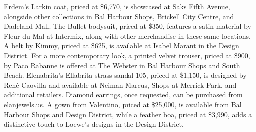 \begin{tcolorbox}[title = {Case 3}, colframe=darkgreen, colback=lightgray, breakable]
Erdem's Larkin coat, priced at \$6,770, is showcased at Saks Fifth Avenue, alongside other collections in Bal Harbour Shops, Brickell City Centre, and Dadeland Mall. The Bullet bodysuit, priced at \$350, features a satin material by Fleur du Mal at Intermix, along with other merchandise in these same locations. A belt by Kimmy, priced at \$625, is available at Isabel Marant in the Design District. For a more contemporary look, a printed velvet trouser, priced at \$900, by Paco Rabanne is offered at The Webster in Bal Harbour Shops and South Beach.
Elenabrita's Ellabrita strass sandal 105, priced at \$1,150, is designed by René Caovilla and available at Neiman Marcus, Shops at Merrick Park, and additional retailers. Diamond earrings, once requested, can be purchased from elanjewels.us.
A gown from Valentino, priced at \$25,000, is available from Bal Harbour Shops and Design District, while a feather boa, priced at \$3,990, adds a distinctive touch to Loewe's designs in the Design District.
\end{tcolorbox}